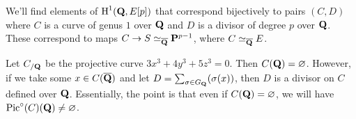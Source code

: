 We'll find elements of $\operatorname{H}^1(\mathbf{Q},E[p])$ that correspond bijectively to 
pairs $(C,D)$ where $C$ is a curve of genus $1$ over $\mathbf{Q}$ and $D$ is a 
divisor of degree $p$ over $\mathbf{Q}$. These correspond to maps 
$C\to S\simeq_{\overline{\mathbf{Q}}} \mathbf{P}^{p-1}$, where $C\simeq_{\overline{\mathbf{Q}}} E$. 

\begin{example}
Let $C_{/\mathbf{Q}}$ be the projective curve $3 x^3+4 y^3+5 z^3=0$. Then 
$C(\mathbf{Q})=\varnothing$. However, if we take some 
$x\in C(\overline{\mathbf{Q}})$ and let $D=\sum_{\sigma\in G_{\mathbf{Q}}} (\sigma(x))$, then 
$D$ is a divisor on $C$ defined over $\mathbf{Q}$. Essentially, the point is that 
even if $C(\mathbf{Q})=\varnothing$, we will have 
$\operatorname{Pic}^\circ(C)(\mathbf{Q})\ne\varnothing$. 
\end{example}




